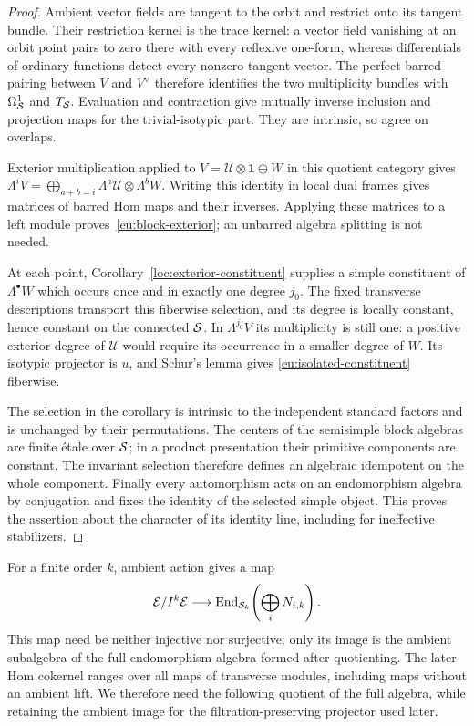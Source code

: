 \begin{proof}
Ambient vector fields are tangent to the orbit and restrict onto its
tangent bundle.  Their restriction kernel is the trace kernel: a vector
field vanishing at an orbit point pairs to zero there with every
reflexive one-form, whereas differentials of ordinary functions detect
every nonzero tangent vector.  The perfect barred pairing between $V$
and $V^\vee$ therefore identifies the two multiplicity bundles with
$\Omega^1_{\mathcal S}$ and $T_{\mathcal S}$.  Evaluation and contraction give mutually
inverse inclusion and projection maps for the trivial-isotypic part.
They are intrinsic, so agree on overlaps.

Exterior multiplication applied to $V=\mathcal U\otimes\mathbf1\oplus W$
in this quotient category gives
$\Lambda^iV=\bigoplus_{a+b=i}\Lambda^a\mathcal U\otimes\Lambda^bW$.
Writing this identity in local dual frames gives matrices of barred
Hom maps and their inverses.  Applying these matrices to a left module
proves~\eqref{eu:block-exterior}; an unbarred algebra splitting is not
needed.

At each point, Corollary~\ref{loc:exterior-constituent} supplies a
simple constituent of $\Lambda^\bullet W$ which occurs once and in
exactly one degree $j_0$.  The fixed transverse descriptions transport
this fiberwise selection, and its degree is locally constant, hence
constant on the connected $\mathcal S$.  In $\Lambda^{j_0}V$ its multiplicity
is still one: a positive exterior degree of $\mathcal U$ would require
its occurrence in a smaller degree of $W$.  Its isotypic projector is
$u$, and Schur's lemma gives \eqref{eu:isolated-constituent} fiberwise.

The selection in the corollary is intrinsic to the independent standard
factors and is unchanged by their permutations.  The centers of the
semisimple block algebras are finite \'etale over $\mathcal S$; in a product
presentation their
primitive components are constant.  The invariant selection therefore
defines an algebraic idempotent on the whole component.  Finally every
automorphism acts on an endomorphism algebra by conjugation and fixes
the identity of the selected simple object.  This proves the assertion
about the character of its identity line, including for ineffective
stabilizers.
\end{proof}

For a finite order $k$, ambient action gives a map
\[
 \mathcal E/I^k\mathcal E\longrightarrow
 \operatorname{End}_{\mathcal S_k}\!\left(\bigoplus_iN_{i,k}\right).
\]
This map need be neither injective nor surjective; only its image is
the ambient subalgebra of the full endomorphism algebra formed after
quotienting.  The later Hom cokernel ranges over all maps of transverse
modules, including maps without an ambient lift.  We therefore need
the following quotient of the full algebra, while retaining the ambient
image for the filtration-preserving projector used later.

